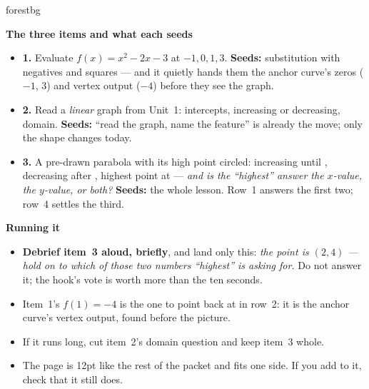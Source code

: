 \documentclass[10pt]{article}
\begin{document}
\begin{fixedskillbox}{forestbg}
\begin{minipage}[t]{0.48\linewidth}
    \textbf{The three items and what each seeds}
    \begin{itemize}
        \item \textbf{1.} Evaluate $f(x)=x^2-2x-3$ at $-1,0,1,3$. \textbf{Seeds:} substitution
              with negatives and squares --- and it quietly hands them the anchor curve's zeros
              ($-1$, $3$) and vertex output ($-4$) before they see the graph.
        \item \textbf{2.} Read a \emph{linear} graph from Unit~1: intercepts, increasing or
              decreasing, domain. \textbf{Seeds:} ``read the graph, name the feature'' is already
              the move; only the shape changes today.
        \item \textbf{3.} A pre-drawn parabola with its high point circled: increasing until
              \underline{\hspace{0.5cm}}, decreasing after \underline{\hspace{0.5cm}}, highest
              point at \underline{\hspace{0.5cm}} --- \emph{and is the ``highest'' answer the
              $x$-value, the $y$-value, or both?} \textbf{Seeds:} the whole lesson. Row~1 answers
              the first two; row~4 settles the third.
    \end{itemize}
\end{minipage}
\hfill
\begin{minipage}[t]{0.48\linewidth}
    \textbf{Running it}
    \begin{itemize}
        \item \textbf{Debrief item~3 aloud, briefly}, and land only this: \emph{the point is
              $(2,4)$ --- hold on to which of those two numbers ``highest'' is asking for.} Do not
              answer it; the hook's vote is worth more than the ten seconds.
        \item Item~1's $f(1)=-4$ is the one to point back at in row~2: it is the anchor curve's
              vertex output, found before the picture.
        \item If it runs long, cut item~2's domain question and keep item~3 whole.
        \item The page is 12pt like the rest of the packet and fits one side. If you add to it,
              check that it still does.
    \end{itemize}
\end{minipage}
\end{fixedskillbox}
\end{document}
